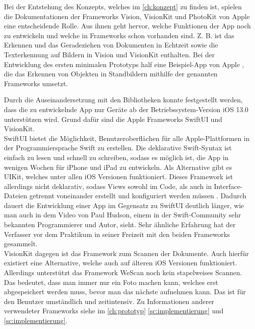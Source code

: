 \documentclass[notables, nomenclature, oneside, 150]{HSMW-Thesis}
\begin{document}
		
		Bei der Entstehung des Konzepts, welches im \autoref{ch:konzept} zu finden ist, spielen die Dokumentationen der Frameworks Vision, VisionKit und PhotoKit von Apple eine entscheidende Rolle. Aus ihnen geht hervor, welche Funktionen der App noch zu entwickeln und welche in Frameworks schon vorhanden sind. Z. B. ist das Erkennen und das Geradeziehen von Dokumenten in Echtzeit sowie die Texterkennung auf Bildern in Vision und VisionKit enthalten. Bei der Entwicklung des ersten minimalen Prototyps half eine Beispiel-App von Apple \cite{apple_detecting_2019}, die das Erkennen von Objekten in Standbildern mithilfe der genannten Frameworks umsetzt.
		
		Durch die Auseinandersetzung mit den Bibliotheken konnte festgestellt werden, dass die zu entwickelnde App nur Geräte ab der Betriebssystem-Version iOS 13.0 unterstützen wird. Grund dafür sind die Apple Frameworks SwiftUI und VisionKit. \\
		SwiftUI bietet die Möglichkeit, Benutzeroberflächen für alle Apple-Plattformen in der Programmiersprache Swift zu erstellen. Die deklarative Swift-Syntax ist einfach zu lesen und schnell zu schreiben, sodass es möglich ist, die App in wenigen Wochen für iPhone und iPad zu entwickeln. Als Alternative gibt es UIKit, welches unter allen iOS Versionen funktioniert. Dieses Framework ist allerdings nicht deklarativ, sodass Views sowohl im Code, als auch in Interface-Dateien getrennt voneinander erstellt und konfiguriert werden müssen \cite{sillmann_einstieg_2019}. Dadurch dauert die Entwicklung einer App im Gegensatz zu SwiftUI deutlich länger, wie man auch in dem Video von Paul Hudson, einem in der Swift-Community sehr bekannten Programmierer und Autor, sieht. Sehr ähnliche Erfahrung hat der Verfasser vor dem Praktikum in seiner Freizeit mit den beiden Frameworks gesammelt. \\
		VisionKit dagegen ist das Framework zum Scannen der Dokumente. Auch hierfür existiert eine Alternative, welche auch auf älteren iOS Versionen funktioniert. Allerdings unterstützt das Framework WeScan noch kein stapelweises Scannen. Das bedeutet, dass man immer nur ein Foto machen kann, welches erst abgespeichert werden muss, bevor man das nächste aufnehmen kann. Das ist für den Benutzer umständlich und zeitintensiv. Zu Informationen anderer verwendeter Frameworks siehe im \autoref{ch:prototyp} \autoref{sc:implementierung} und \autoref{sc:implementierung}.
\end{document}

